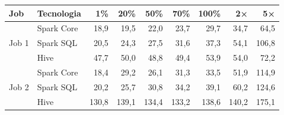 \begin{tabular}{@{}l l rrrrrrr@{}}
\toprule
Job & Tecnologia & 1\% & 20\% & 50\% & 70\% & 100\% & 2× & 5× \\
\midrule
\multirow{3}{*}{Job 1} & Spark Core & 18,9 & 19,5 & 22,0 & 23,7 & 29,7 & 34,7 & 64,5 \\
 & Spark SQL & 20,5 & 24,3 & 27,5 & 31,6 & 37,3 & 54,1 & 106,8 \\
 & Hive & 47,7 & 50,0 & 48,8 & 49,4 & 53,9 & 54,0 & 72,2 \\
\midrule
\multirow{3}{*}{Job 2} & Spark Core & 18,4 & 29,2 & 26,1 & 31,3 & 33,5 & 51,9 & 114,9 \\
 & Spark SQL & 20,2 & 25,7 & 30,8 & 34,2 & 39,1 & 60,2 & 124,6 \\
 & Hive & 130,8 & 139,1 & 134,4 & 133,2 & 138,6 & 140,2 & 175,1 \\
\bottomrule
\end{tabular}